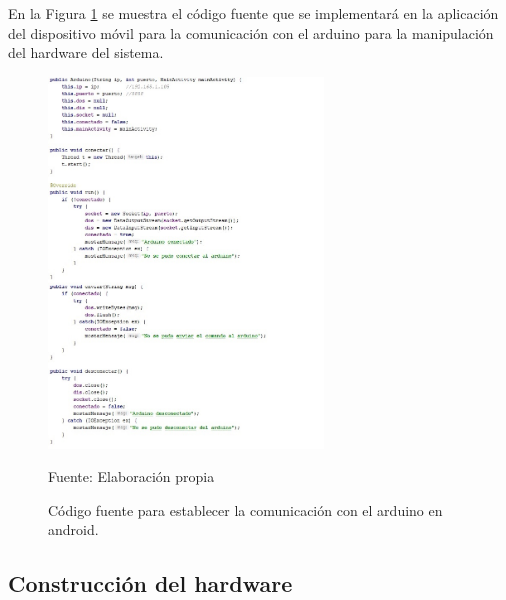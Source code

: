 En la Figura \ref{fig:figura3.63} se muestra el código fuente que se implementará en la aplicación del dispositivo móvil para la comunicación con el arduino para la manipulación del hardware del sistema.
\begin{figure}[H]
\captionsetup{justification=centering}
\begin{center}
\includegraphics[width=0.65\textwidth]{Imagenes/Cap3/image063}
\end{center}
\begin{center}
\vskip -0.5cm
\caption{\small{Código fuente para establecer la comunicación con el arduino en android.}}
\label{fig:figura3.63}
{\small{Fuente: Elaboración propia}}
\end{center}
\end{figure}

\subsection{Construcción del hardware}
